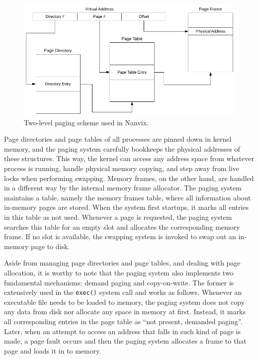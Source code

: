 	\begin{figure}
		\centering
		\includegraphics[scale=0.85]{img/paging-scheme}
		\caption{Two-level paging scheme used in Nanvix.}
		\label{figure: paging scheme}
	\end{figure}

	Page directories and page tables of all processes are pinned down in
	kernel memory, and the paging system carefully bookkeeps the
	physical addresses of these structures. This way, the kernel can
	access any address space from whatever process is running, handle
	physical memory copying, and step away from live locks when
	performing swapping. Memory frames, on the other hand, are handled
	in a different way by the internal memory frame allocator. The
	paging system maintains a table, namely the memory frames table,
	where all information about in-memory pages are stored. When the
	system first startups, it marks all entries in this table as not
	used. Whenever a page is requested, the paging system searches this
	table for an empty slot and allocates the corresponding memory
	frame. If no slot is available, the swapping system is invoked to
	swap out an in-memory page to disk.

	Aside from managing page directories and page tables, and dealing
	with page allocation, it is worthy to note that the paging system
	also implements two fundamental mechanisms: demand paging and
	copy-on-write. The former is extensively used in the \texttt{exec()}
	system call and works as follows. Whenever an executable file needs
	to be loaded to memory, the paging system does not copy any data
	from disk nor allocate any space in memory at first. Instead, it
	marks all corresponding entries in the page table as ``not present,
	demanded paging''. Later, when an attempt to access an address that
	falls in such kind of page is made, a page fault occurs and then the
	paging system allocates a frame to that page and loads it in to
	memory. 

